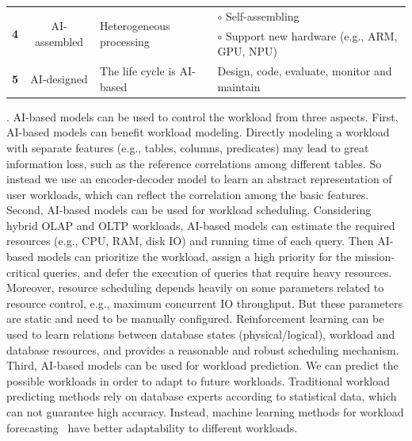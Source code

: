 \begin{table}[!t]
{\begin{tabular}{|c|c|l|l|}
\multirow{2}{*}{\textbf{4}} & \multirow{2}{*}{AI-assembled} & \multirow{2}{*}{Heterogeneous processing} & $\circ$ Self-assembling\\
&  & & $\circ$ Support new hardware (e.g., ARM, GPU, NPU)\\\hline


\multirow{1}{*}{\textbf{5}} & \multirow{1}{*}{AI-designed} & \multirow{1}{*}{The life cycle is AI-based} &Design, code, evaluate, monitor
and maintain \\\hline
  
  \end{tabular}
}
\vspace{-1em}
\end{table}


. AI-based models can be used to control the workload from three aspects.
First, AI-based models can benefit workload modeling. Directly modeling a workload with separate features (e.g., tables, columns, predicates) may  lead to great information loss, such as the reference correlations among different tables. So instead we use an encoder-decoder model to learn an abstract representation of user workloads, which can reflect the correlation among the basic features. Second, AI-based models can be used for workload scheduling. Considering hybrid OLAP and OLTP workloads, AI-based models can estimate the required resources (e.g., CPU, RAM, disk IO) and running time of each query. Then AI-based models can prioritize the workload, assign a high priority for the mission-critical queries, and defer the execution of queries that require heavy resources. Moreover, resource scheduling depends heavily on some parameters related to resource control, e.g., maximum concurrent IO throughput. But these parameters are static and need to be manually configured. Reinforcement learning can be used to learn relations between database states (physical/logical), workload and database resources, and provides a reasonable and robust scheduling mechanism. Third, AI-based models can be used for workload prediction. We can predict the possible workloads in order to adapt to future workloads. Traditional workload predicting methods rely on database experts according to statistical data, which can not guarantee high accuracy. Instead, machine learning methods for workload forecasting~\cite{DBLP:conf/sigmod/MaAHMPG18} have better adaptability to different workloads. 


